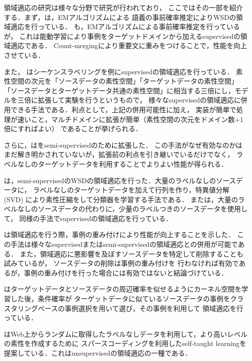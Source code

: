 \documentclass[japanese]{jnlp_1.4}
\begin{document}
領域適応の研究は様々な分野で研究が行われており，
ここではその一部を紹介する．まず，\cite{article2}は，EMアルゴリズムによる
語義の事前確率推定によりWSDの領域適応を行っている．
\cite{article3}も，EMアルゴリズムによる事前確率推定を行っているが，
これは能動学習により事例をターゲットドメインから加えるsupervisedの領域適応である．
Count-mergingにより重要文に重みをつけることで，性能を向上させている．

また，
\cite{article4}はシーケンスラベリングを例にsupervisedの領域適応を行っている．
素性空間の次元を「ソースデータの素性空間」「ターゲットデータの素性空間」
「ソースデータとターゲットデータ共通の素性空間」に相当する三倍にし，モデルを三倍に拡張して実験を行うというもので，
様々なsupervisedの領域適応に併用できる手法である．利点として，上記の併用可能性に加え，
実装が簡単で処理が速いこと，マルチドメインに拡張が簡単（素性空間の次元をドメイン数+1倍にすればよい）
であることが挙げられる．

さらに，\cite{article12}は\cite{article4}をsemi-supervisedのために拡張した．
この手法がなぜ有効なのかはまだ解き明かされていないが，拡張前の利点を引き継いでいるだけでなく，
ラベルなしのターゲットデータを利用することでよりよい性能が得られる．

\cite{article5}は，semi-supervisedのWSDの領域適応を行った．大量のラベルなしのソースデータに，
ラベルなしのターゲットデータを加えて行列を作り，特異値分解 (SVD) により素性圧縮をして分類器を学習する手法である．
また\cite{article6}は，大量のラベルなしのソースデータの代わりに，少量のラベルつきのソースデータを使用して，
同様の手法でsupervisedの領域適応を行っている．

\cite{article7}は領域適応を行う際，事例の重み付けにより性能が向上することを示した．
この手法は様々なsupervisedまたはsemi-supervisedの領域適応との併用が可能である．
また，領域適応に悪影響を及ぼすソースデータを特定して削除することも試みているが，
ソースデータの削除は事例の重み付けを
行わなければ有効であるが，事例の重み付けを行った場合には有効ではないと結論づけている．

\cite{article14}はターゲットデータとソースデータの周辺確率を似せるようにカーネル空間を学習した後，条件確率が
ターゲットデータに似ているソースデータの事例をクラスタリングベースの事例選択を用いて選び，その事例を利用して
領域適応を行っている．


\cite{article15}はWeb上からランダムに取得したラベルなしデータを利用して，より高いレベルの素性を作成するために
スパースコーディングを利用したself-taught learningを提案している．これはunsupervisedの領域適応の一種である．
\end{document}
